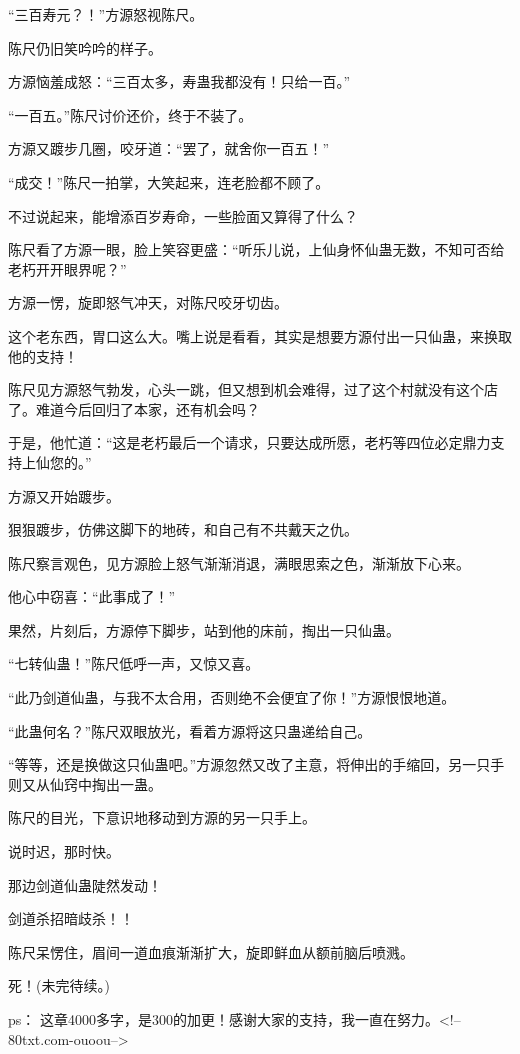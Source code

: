 \begin{this_body}
“三百寿元？！”方源怒视陈尺。

陈尺仍旧笑吟吟的样子。

方源恼羞成怒：“三百太多，寿蛊我都没有！只给一百。”

“一百五。”陈尺讨价还价，终于不装了。

方源又踱步几圈，咬牙道：“罢了，就舍你一百五！”

“成交！”陈尺一拍掌，大笑起来，连老脸都不顾了。

不过说起来，能增添百岁寿命，一些脸面又算得了什么？

陈尺看了方源一眼，脸上笑容更盛：“听乐儿说，上仙身怀仙蛊无数，不知可否给老朽开开眼界呢？”

方源一愣，旋即怒气冲天，对陈尺咬牙切齿。

这个老东西，胃口这么大。嘴上说是看看，其实是想要方源付出一只仙蛊，来换取他的支持！

陈尺见方源怒气勃发，心头一跳，但又想到机会难得，过了这个村就没有这个店了。难道今后回归了本家，还有机会吗？

于是，他忙道：“这是老朽最后一个请求，只要达成所愿，老朽等四位必定鼎力支持上仙您的。”

方源又开始踱步。

狠狠踱步，仿佛这脚下的地砖，和自己有不共戴天之仇。

陈尺察言观色，见方源脸上怒气渐渐消退，满眼思索之色，渐渐放下心来。

他心中窃喜：“此事成了！”

果然，片刻后，方源停下脚步，站到他的床前，掏出一只仙蛊。

“七转仙蛊！”陈尺低呼一声，又惊又喜。

“此乃剑道仙蛊，与我不太合用，否则绝不会便宜了你！”方源恨恨地道。

“此蛊何名？”陈尺双眼放光，看着方源将这只蛊递给自己。

“等等，还是换做这只仙蛊吧。”方源忽然又改了主意，将伸出的手缩回，另一只手则又从仙窍中掏出一蛊。

陈尺的目光，下意识地移动到方源的另一只手上。

说时迟，那时快。

那边剑道仙蛊陡然发动！

剑道杀招暗歧杀！！

陈尺呆愣住，眉间一道血痕渐渐扩大，旋即鲜血从额前脑后喷溅。

死！(未完待续。)

ps：    这章4000多字，是300的加更！感谢大家的支持，我一直在努力。<!--80txt.com-ouoou-->

\end{this_body}

